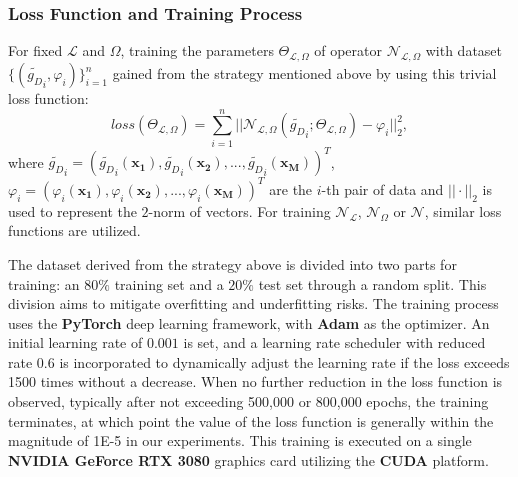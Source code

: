 \documentclass{article}
\begin{document}
\subsubsection{Loss Function and Training Process}
For fixed $\mathcal{L}$ and $\Omega$, training the parameters $\Theta_{\mathcal{L}, \Omega}$ of operator $\mathcal{N}_{\mathcal{L}, \Omega}$ with dataset $\{ (\widetilde{g_D}_i, \varphi_i) \}_{i = 1}^n$ gained from the strategy mentioned above by using this trivial loss function:
\begin{equation} \label{eq3.2.3.1}
loss(\Theta_{\mathcal{L}, \Omega}) = \sum_{i = 1}^n || \mathcal{N}_{\mathcal{L}, \Omega}(\widetilde{g_D}_i; \Theta_{\mathcal{L}, \Omega}) - \varphi_i ||_2^2,
\end{equation}
where $\widetilde{g_D}_i = (\widetilde{g_D}_i(\mathbf{x_1}), \widetilde{g_D}_i(\mathbf{x_2}), ..., \widetilde{g_D}_i(\mathbf{x_M}))^T$, $\varphi_i = (\varphi_i(\mathbf{x_1}), \varphi_i(\mathbf{x_2}), ..., \varphi_i(\mathbf{x_M}))^T$ are the $i$-th pair of data and $||\cdot||_2$ is used to represent the $2$-norm of vectors. For training $\mathcal{N}_{\mathcal{L}}$, $\mathcal{N}_{\Omega}$ or $\mathcal{N}$, similar loss functions are utilized.

The dataset derived from the strategy above is divided into two parts for training: an $80\%$ training set and a $20\%$ test set through a random split. This division aims to mitigate overfitting and underfitting risks. The training process uses the \textbf{PyTorch} deep learning framework, with \textbf{Adam} as the optimizer. An initial learning rate of $0.001$ is set, and a learning rate scheduler with reduced rate $0.6$ is incorporated to dynamically adjust the learning rate if the loss exceeds 1500 times without a decrease. When no further reduction in the loss function is observed, typically after not exceeding 500,000 or 800,000 epochs, the training terminates, at which point the value of the loss function is generally within the magnitude of 1E-5 in our experiments. This training is executed on a single \textbf{NVIDIA GeForce RTX 3080} graphics card utilizing the \textbf{CUDA} platform.
\end{document}
